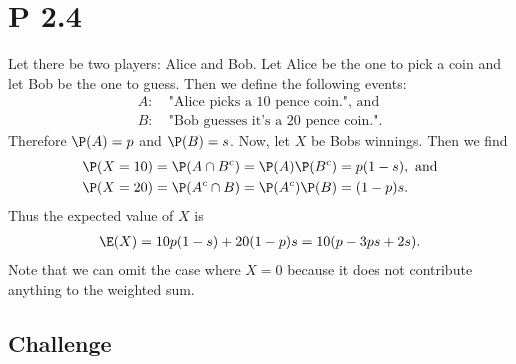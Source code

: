 \documentclass{article}
\begin{document}
\section*{P 2.4}


Let there be two players: Alice and Bob. Let Alice be the one to pick
a coin and let Bob be the one to guess. Then we define the following
events:
\begin{align*}
	A: & \:\text{"Alice picks a 10 pence coin.", and}  \\
	B: & \:\text{"Bob guesses it's a 20 pence coin."}.
\end{align*}
Therefore $\P(A)=p$ and $\P(B)=s$.
Now, let $X$ be Bobs winnings. Then we find
\begin{align*}
	\P(X=10) & = \P(A\cap B^c) = \P(A)\P(B^c) = p(1-s),\text{ and} \\
	\P(X=20) & = \P(A^c\cap B) = \P(A^c)\P(B) = (1-p)s.
\end{align*}
Thus the expected value of $X$ is
\begin{align*}
	\E(X) = 10p(1-s)+20(1-p)s = 10(p - 3ps + 2s).
\end{align*}
Note that we can omit the case where $X=0$ because it does
not contribute anything to the weighted sum.

\subsection*{Challenge}
\end{document}
